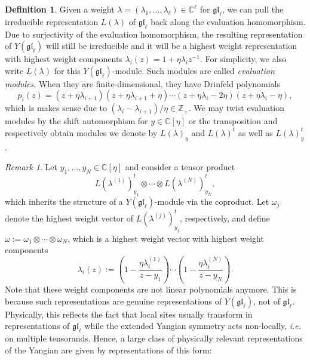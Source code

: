 \documentclass[11pt]{report}
\theoremstyle{definition}
\newtheorem{definition}[theorem]{Definition}
\theoremstyle{remark}
\newtheorem*{remark}{Remark}
\theoremstyle{remark}
\newcommand{\Z}{\mathbb{Z}}
\newcommand{\C}{\mathbb{C}}
\begin{document}
\begin{definition}
Given a weight $\lambda = (\lambda_1,...,\lambda_\ell) \in \C^\ell$ for $\mathfrak{gl}_\ell$, we can pull the irreducible representation $L(\lambda)$ of $\mathfrak{gl}_\ell$ back along the evaluation homomorphism. Due to surjectivity of the evaluation homomorphism, the resulting representation of $Y(\mathfrak{gl}_\ell)$ will still be irreducible and it will be a highest weight representation with highest weight components $\lambda_i(z) = 1 + \eta \lambda_i z^{-1}$. For simplicity, we also write $L(\lambda)$ for this $Y(\mathfrak{gl}_\ell)$-module. Such modules are called \emph{evaluation modules}. When they are finite-dimensional, they have Drinfeld polynomials
\begin{equation*}
p_i(z) = (z+\eta \lambda_{i+1})(z+\eta \lambda_{i+1}+\eta) \cdots (z+\eta \lambda_i-2\eta)(z+\eta \lambda_i-\eta),
\end{equation*}
which is makes sense due to $(\lambda_i - \lambda_{i+1})/\eta \in \Z_+$. We may twist evaluation modules by the shift automorphism for $y \in \C[\eta]$ or the transposition and respectively obtain modules we denote by $L(\lambda)_y$ and $L(\lambda)^t$ as well as $L(\lambda)_y^t$.
\end{definition}

\begin{remark}
Let $y_1,...,y_N \in \C[\eta]$ and consider a tensor product
\begin{equation*}
L(\lambda^{(1)})_{y_1}^t \otimes \cdots \otimes L(\lambda^{(N)})_{y_N}^t,
\end{equation*}
which inherits the structure of a $Y(\mathfrak{gl}_\ell)$-module via the coproduct. Let $\omega_j$ denote the highest weight vector of $L(\lambda^{(j)})_{y_j}^t$, respectively, and define $\omega := \omega_1 \otimes \cdots \otimes \omega_N$, which is a highest weight vector with highest weight components
\begin{equation*}
\lambda_i(z) := \left( 1 - \frac{\eta \lambda_i^{(1)}}{z-y_1} \right) \cdots \left( 1 - \frac{\eta \lambda_i^{(N)}}{z-y_N} \right).
\end{equation*}
Note that these weight components are not linear polynomials anymore. This is because such representations are genuine representations of $Y(\mathfrak{gl}_\ell)$, not of $\mathfrak{gl}_\ell$. Physically, this reflects the fact that local sites usually transform in representations of $\mathfrak{gl}_\ell$ while the extended Yangian symmetry acts non-locally, \emph{i.e.} on multiple tensorands. Hence, a large class of physically relevant representations of the Yangian are given by representations of this form:
\end{remark}
\end{document}
